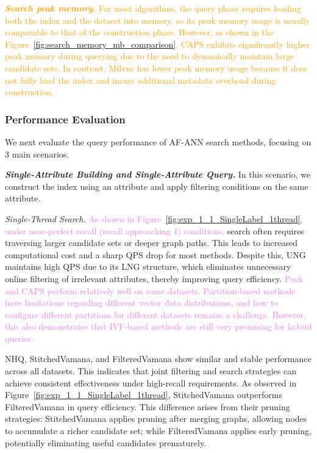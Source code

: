\documentclass[sigconf, nonacm]{acmart}
\begin{document}
\textit{\textbf{ \textcolor{orange}{Search peak memory.}}}
\textcolor{orange}{For most algorithms, the query phase requires loading both the index and the dataset into memory, so its peak memory usage is usually comparable to that of the construction phase. However, as shown in the Figure~\ref{fig:search_memory_mb_comparison}, CAPS exhibits significantly higher peak memory during querying due to the need to dynamically maintain large candidate sets. In contrast, Milvus has lower peak memory usage because it does not fully load the index and incurs additional metadata overhead during construction.
}
	
	\subsubsection{Performance Evaluation}
	
	
	
	
	We next evaluate the query performance of AF-ANN search methods, focusing on 3 main scenarios.
	
	\textit{\textbf{Single-Attribute Building and Single-Attribute Query.}}
	In this scenario, we construct the index using an attribute and apply filtering conditions on the same attribute.
	
	
	\textit{Single-Thread Search.}  
	\textcolor{violet}{As shown in Figure~\ref{fig:exp_1_1_SingleLabel_1thread}, under near-perfect recall (recall approaching 1) conditions,} search often requires traversing larger candidate sets or deeper graph paths. This leads to increased computational cost and a sharp QPS drop for most methods. Despite this, UNG maintains high QPS due to its LNG structure, which eliminates unnecessary online filtering of irrelevant attributes, thereby improving query efficiency. \textcolor{violet}{Puck and CAPS perform relatively well on some datasets. Partition-based methods have limitations regarding different vector data distributions, and how to configure different partitions for different datasets remains a challenge. However, this also demonstrates that IVF-based methods are still very promising for hybrid queries.}
	
	NHQ, StitchedVamana, and FilteredVamana show similar and stable performance across all datasets. This indicates that joint filtering and search strategies can achieve consistent effectiveness under high-recall requirements. As observed in Figure~\ref{fig:exp_1_1_SingleLabel_1thread}, StitchedVamana outperforms FilteredVamana in query efficiency. This difference arises from their pruning strategies: StitchedVamana applies pruning after merging graphs, allowing nodes to accumulate a richer candidate set; while FilteredVamana applies early pruning, potentially eliminating useful candidates prematurely.
	
\end{document}

